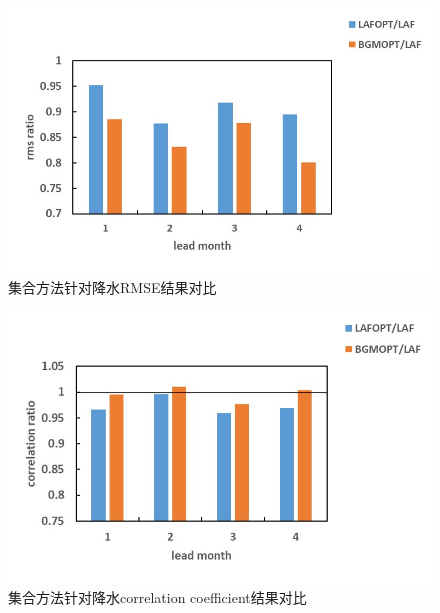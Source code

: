 \begin{figure}[H] %
\label{prectresult}
  \centering
  \includegraphics{figures/rmse-precip.jpg}
  \caption{集合方法针对降水RMSE结果对比}
  \label{fig:xfig1}
\end{figure} 

\begin{figure}[H] %
\label{prectresult}
  \centering
  \includegraphics{figures/corr-precip.jpg}
  \caption{集合方法针对降水correlation coefficient结果对比}
  \label{fig:xfig1}
\end{figure} 

